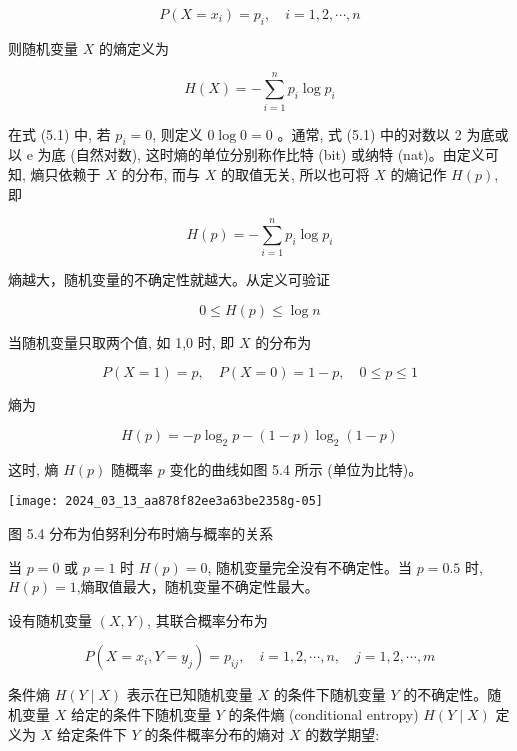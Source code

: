\documentclass[10pt]{article}
\begin{document}
\begin{CJK*}{UTF8}{bsmi}
$$
P\left(X=x_{i}\right)=p_{i}, \quad i=1,2, \cdots, n
$$

则随机变量 $X$ 的熵定义为


\begin{equation*}
H(X)=-\sum_{i=1}^{n} p_{i} \log p_{i} \tag{5.1}
\end{equation*}


在式 (5.1) 中, 若 $p_{i}=0$, 则定义 $0 \log 0=0$ 。通常, 式 (5.1) 中的对数以 2 为底或以 $\mathrm{e}$ 为底 (自然对数), 这时熵的单位分别称作比特 (bit) 或纳特 (nat)。由定义可知, 熵只依赖于 $X$ 的分布, 而与 $X$ 的取值无关, 所以也可将 $X$ 的熵记作 $H(p)$, 即


\begin{equation*}
H(p)=-\sum_{i=1}^{n} p_{i} \log p_{i} \tag{5.2}
\end{equation*}


熵越大，随机变量的不确定性就越大。从定义可验证


\begin{equation*}
0 \leqslant H(p) \leqslant \log n \tag{5.3}
\end{equation*}


当随机变量只取两个值, 如 1,0 时, 即 $X$ 的分布为

$$
P(X=1)=p, \quad P(X=0)=1-p, \quad 0 \leqslant p \leqslant 1
$$

熵为


\begin{equation*}
H(p)=-p \log _{2} p-(1-p) \log _{2}(1-p) \tag{5.4}
\end{equation*}


这时, 熵 $H(p)$ 随概率 $p$ 变化的曲线如图 5.4 所示 (单位为比特)。

\begin{center}
\texttt{[image: 2024\_03\_13\_aa878f82ee3a63be2358g-05]}
\end{center}

图 5.4 分布为伯努利分布时熵与概率的关系

当 $p=0$ 或 $p=1$ 时 $H(p)=0$, 随机变量完全没有不确定性。当 $p=0.5$ 时, $H(p)=1$,熵取值最大，随机变量不确定性最大。

设有随机变量 $(X, Y)$, 其联合概率分布为

$$
P\left(X=x_{i}, Y=y_{j}\right)=p_{i j}, \quad i=1,2, \cdots, n, \quad j=1,2, \cdots, m
$$

条件熵 $H(Y \mid X)$ 表示在已知随机变量 $X$ 的条件下随机变量 $Y$ 的不确定性。随机变量 $X$ 给定的条件下随机变量 $Y$ 的条件熵 (conditional entropy) $H(Y \mid X)$ 定义为 $X$ 给定条件下 $Y$ 的条件概率分布的熵对 $X$ 的数学期望:



\end{CJK*}
\end{document}

